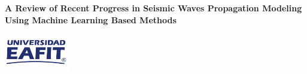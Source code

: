 \documentclass[11pt,twoside]{article}
\begin{document}
\thispagestyle{empty}  



\vspace{-2mm} 
\begin{minipage}{11.5cm}
    \begin{center}
        \textbf{\large A Review of Recent Progress in Seismic Waves Propagation Modeling Using 
        Machine Learning Based Methods}  
    \end{center}                 
\end{minipage} 
\begin{minipage}{4.2cm}
    \begin{center}
        \hspace{-0.2cm}\includegraphics[width=2.8cm]{figs/format/Logo_EAFIT.pdf}
    \end{center}
\end{minipage}    
\vspace{-2mm} 

\end{document}

